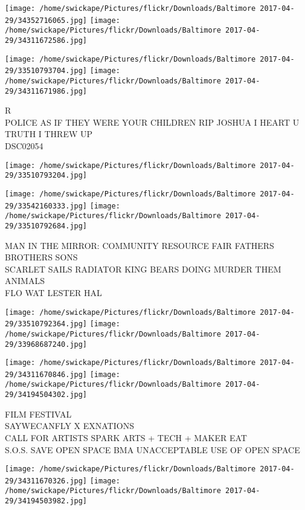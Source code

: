 \documentclass[10pt,letterpaper]{article}
\begin{document}
\texttt{[image: /home/swickape/Pictures/flickr/Downloads/Baltimore 2017-04-29/34352716065.jpg]}
\texttt{[image: /home/swickape/Pictures/flickr/Downloads/Baltimore 2017-04-29/34311672586.jpg]}

\texttt{[image: /home/swickape/Pictures/flickr/Downloads/Baltimore 2017-04-29/33510793704.jpg]}
\texttt{[image: /home/swickape/Pictures/flickr/Downloads/Baltimore 2017-04-29/34311671986.jpg]}

R\\
POLICE AS IF THEY WERE YOUR CHILDREN RIP JOSHUA I HEART U\\
TRUTH I THREW UP\\
DSC02054\\
\pagebreak

\texttt{[image: /home/swickape/Pictures/flickr/Downloads/Baltimore 2017-04-29/33510793204.jpg]}

\vspace{0.25in}
\texttt{[image: /home/swickape/Pictures/flickr/Downloads/Baltimore 2017-04-29/33542160333.jpg]}
\texttt{[image: /home/swickape/Pictures/flickr/Downloads/Baltimore 2017-04-29/33510792684.jpg]}

MAN IN THE MIRROR: COMMUNITY RESOURCE FAIR FATHERS BROTHERS SONS\\
SCARLET SAILS RADIATOR KING BEARS DOING MURDER THEM ANIMALS\\
FLO WAT LESTER HAL\\
\pagebreak

\texttt{[image: /home/swickape/Pictures/flickr/Downloads/Baltimore 2017-04-29/33510792364.jpg]}
\texttt{[image: /home/swickape/Pictures/flickr/Downloads/Baltimore 2017-04-29/33968687240.jpg]}

\texttt{[image: /home/swickape/Pictures/flickr/Downloads/Baltimore 2017-04-29/34311670846.jpg]}
\texttt{[image: /home/swickape/Pictures/flickr/Downloads/Baltimore 2017-04-29/34194504302.jpg]}

FILM FESTIVAL\\
SAYWECANFLY X EXNATIONS\\
CALL FOR ARTISTS SPARK ARTS + TECH + MAKER EAT\\
S.O.S. SAVE OPEN SPACE BMA UNACCEPTABLE USE OF OPEN SPACE\\
\pagebreak

\texttt{[image: /home/swickape/Pictures/flickr/Downloads/Baltimore 2017-04-29/34311670326.jpg]}
\texttt{[image: /home/swickape/Pictures/flickr/Downloads/Baltimore 2017-04-29/34194503982.jpg]}
\end{document}
